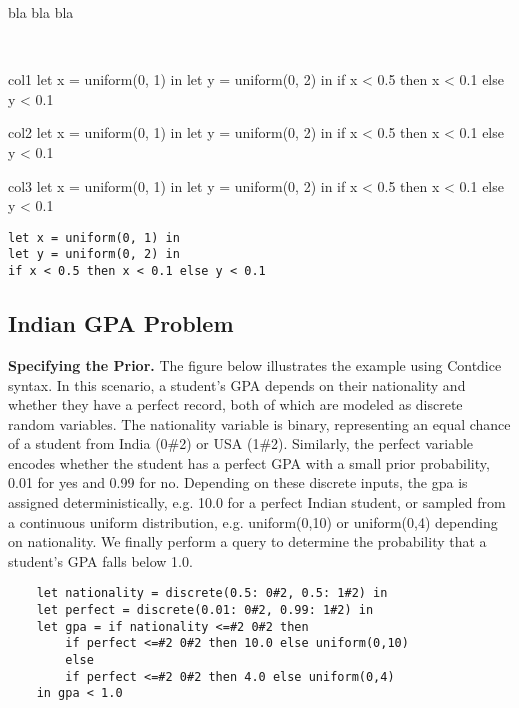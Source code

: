 \documentclass[acmsmall,screen,dvipsnames,x11names,nonacm,anonymous,review]{acmart}
\begin{document}
bla bla bla

\ \\

\noindent
\begin{minipage}[t]{0.32\textwidth}
\begin{mybox}{col1}
let x = uniform(0, 1) in
let y = uniform(0, 2) in
if x < 0.5 
   then x < 0.1 
   else y < 0.1
\end{mybox}
\end{minipage}
\hfill
\begin{minipage}[t]{0.32\textwidth}
\begin{mybox}{col2}
let x = uniform(0, 1) in
let y = uniform(0, 2) in
if x < 0.5 
   then x < 0.1 
   else y < 0.1
\end{mybox}
\end{minipage}
\hfill
\begin{minipage}[t]{0.32\textwidth}
\begin{mybox}{col3}
let x = uniform(0, 1) in
let y = uniform(0, 2) in
if x < 0.5 
   then x < 0.1 
   else y < 0.1
\end{mybox}
\end{minipage}


\begin{lstlisting}
let x = uniform(0, 1) in
let y = uniform(0, 2) in
if x < 0.5 then x < 0.1 else y < 0.1
\end{lstlisting}


\subsection{Indian GPA Problem}

\textbf{Specifying the Prior.} The figure below illustrates the example using Contdice syntax. In this scenario, a student's GPA depends on their nationality and whether they have a perfect record, both of which are modeled as discrete random variables. The nationality variable is binary, representing an equal chance of a student from India (0\#2) or USA (1\#2). Similarly, the perfect variable encodes whether the student has a perfect GPA with a small prior probability, 0.01 for yes and 0.99 for no. Depending on these discrete inputs, the gpa is assigned deterministically, e.g. 10.0 for a perfect Indian student, or sampled from a continuous uniform distribution, e.g. uniform(0,10) or uniform(0,4) depending on nationality. We finally perform a query to determine the probability that a student's GPA falls below 1.0.

\begin{lstlisting}
    let nationality = discrete(0.5: 0#2, 0.5: 1#2) in
    let perfect = discrete(0.01: 0#2, 0.99: 1#2) in
    let gpa = if nationality <=#2 0#2 then 
        if perfect <=#2 0#2 then 10.0 else uniform(0,10)
        else
        if perfect <=#2 0#2 then 4.0 else uniform(0,4) 
    in gpa < 1.0
\end{lstlisting}
\end{document}
